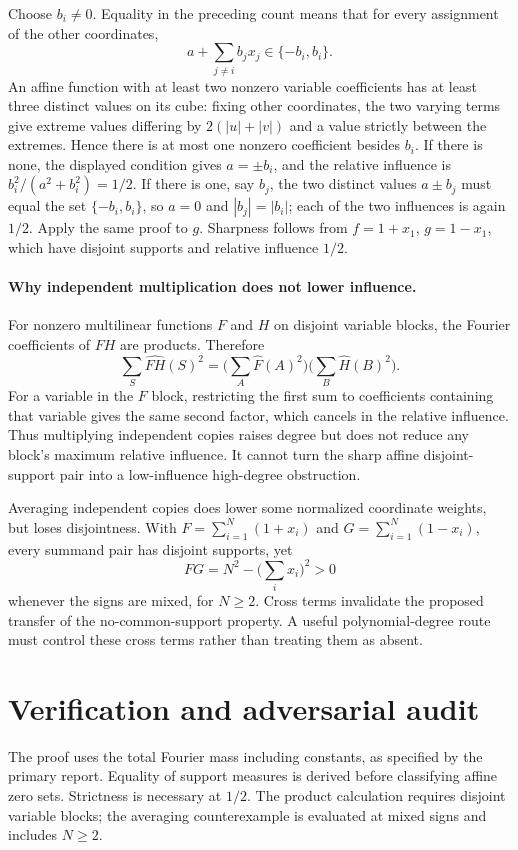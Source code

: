 \documentclass[11pt]{article}
\begin{document}
Choose $b_i\ne0$. Equality in the preceding count means that for every assignment of the other coordinates,
\[
a+\sum_{j\ne i}b_jx_j\in\{-b_i,b_i\}.
\]
An affine function with at least two nonzero variable coefficients has at least three distinct values on its cube: fixing other coordinates, the two varying terms give extreme values differing by $2(|u|+|v|)$ and a value strictly between the extremes. Hence there is at most one nonzero coefficient besides $b_i$. If there is none, the displayed condition gives $a=\pm b_i$, and the relative influence is $b_i^2/(a^2+b_i^2)=1/2$. If there is one, say $b_j$, the two distinct values $a\pm b_j$ must equal the set $\{-b_i,b_i\}$, so $a=0$ and $|b_j|=|b_i|$; each of the two influences is again $1/2$. Apply the same proof to $g$. Sharpness follows from $f=1+x_1$, $g=1-x_1$, which have disjoint supports and relative influence $1/2$.

\paragraph{Why independent multiplication does not lower influence.}
For nonzero multilinear functions $F$ and $H$ on disjoint variable blocks, the Fourier coefficients of $FH$ are products. Therefore
\[
\sum_S \widehat{FH}(S)^2=\Big(\sum_A\widehat F(A)^2\Big)
\Big(\sum_B\widehat H(B)^2\Big).
\]
For a variable in the $F$ block, restricting the first sum to coefficients containing that variable gives the same second factor, which cancels in the relative influence. Thus multiplying independent copies raises degree but does not reduce any block's maximum relative influence. It cannot turn the sharp affine disjoint-support pair into a low-influence high-degree obstruction.

Averaging independent copies does lower some normalized coordinate weights, but loses disjointness. With $F=\sum_{i=1}^N(1+x_i)$ and $G=\sum_{i=1}^N(1-x_i)$, every summand pair has disjoint supports, yet
\[
FG=N^2-\Big(\sum_i x_i\Big)^2>0
\]
whenever the signs are mixed, for $N\geq2$. Cross terms invalidate the proposed transfer of the no-common-support property. A useful polynomial-degree route must control these cross terms rather than treating them as absent.
\section{Verification and adversarial audit}
The proof uses the total Fourier mass including constants, as specified by the primary report. Equality of support measures is derived before classifying affine zero sets. Strictness is necessary at $1/2$. The product calculation requires disjoint variable blocks; the averaging counterexample is evaluated at mixed signs and includes $N\geq2$.
\end{document}
